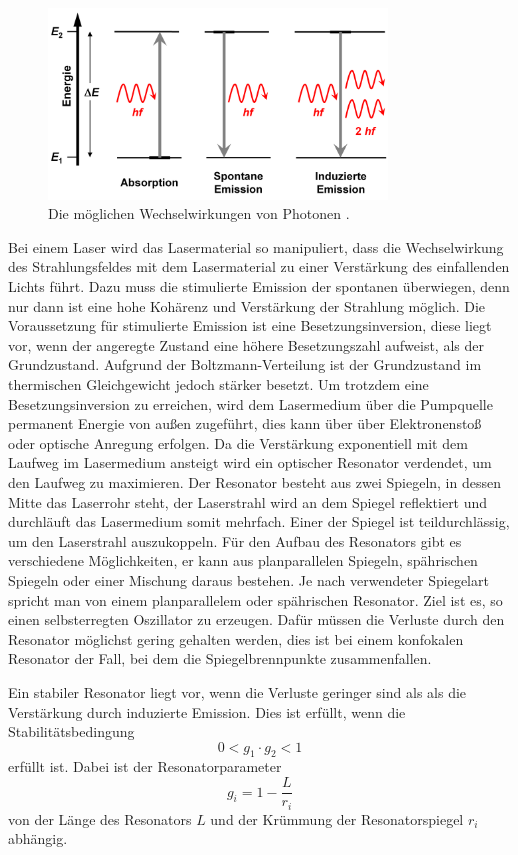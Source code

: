 \begin{figure}[H]
  \centering
  \includegraphics[width=9cm]{Emission.png}
  \caption{Die möglichen Wechselwirkungen von Photonen \cite{seos}.}
  \label{fig:Emission}
\end{figure}

Bei einem Laser wird das Lasermaterial so manipuliert, dass die Wechselwirkung des Strahlungsfeldes
mit dem Lasermaterial zu einer Verstärkung des einfallenden Lichts führt. Dazu muss die stimulierte
Emission der spontanen überwiegen, denn nur dann ist eine hohe Kohärenz und Verstärkung der Strahlung möglich.
Die Voraussetzung für stimulierte Emission ist eine Besetzungsinversion, diese liegt vor, wenn der angeregte Zustand
eine höhere Besetzungszahl aufweist, als der Grundzustand. Aufgrund der Boltzmann-Verteilung ist der Grundzustand im
thermischen Gleichgewicht jedoch stärker besetzt. Um trotzdem eine Besetzungsinversion zu erreichen, wird dem
Lasermedium über die Pumpquelle permanent Energie von außen zugeführt, dies kann über über Elektronenstoß
oder optische Anregung erfolgen.
Da die Verstärkung exponentiell mit dem Laufweg im Lasermedium ansteigt wird ein optischer Resonator verdendet, um den
Laufweg zu maximieren. Der Resonator besteht aus zwei Spiegeln, in dessen Mitte das Laserrohr steht, der Laserstrahl wird an
dem Spiegel reflektiert und durchläuft das Lasermedium somit mehrfach. Einer der Spiegel ist teildurchlässig, um den Laserstrahl
auszukoppeln. Für den Aufbau des Resonators gibt es verschiedene Möglichkeiten, er kann aus planparallelen Spiegeln, spährischen
Spiegeln oder einer Mischung daraus bestehen. Je nach verwendeter Spiegelart spricht man von einem planparallelem oder spährischen
Resonator. Ziel ist es, so einen selbsterregten Oszillator zu erzeugen. Dafür müssen die Verluste durch den Resonator möglichst gering
gehalten werden, dies ist bei einem konfokalen Resonator der Fall, bei dem die Spiegelbrennpunkte zusammenfallen.

Ein stabiler Resonator liegt vor, wenn die Verluste geringer sind als als die Verstärkung durch induzierte Emission.
Dies ist erfüllt, wenn die Stabilitätsbedingung
\begin{equation}
  0< g_1 \cdot g_2 <1
\end{equation}
erfüllt ist.
Dabei ist der Resonatorparameter
\begin{equation}
  g_i = 1- \frac{L}{r_i}
\end{equation}
von der Länge des Resonators $L$ und der Krümmung der Resonatorspiegel $r_i$ abhängig.

